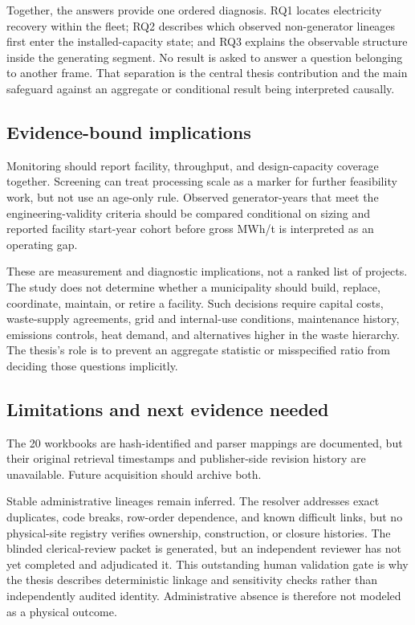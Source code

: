 \documentclass[12pt,a4paper]{article}
\begin{document}
Together, the answers provide one ordered diagnosis. RQ1 locates electricity
recovery within the fleet; RQ2 describes which observed non-generator lineages
first enter the installed-capacity state; and RQ3 explains the observable
structure inside the generating segment. No result is asked to answer a
question belonging to another frame. That separation is the central thesis
contribution and the main safeguard against an aggregate or conditional result
being interpreted causally.

\subsection{Evidence-bound implications}

Monitoring should report facility, throughput, and design-capacity coverage
together. Screening can treat processing scale as a marker for further
feasibility work, but not use an age-only rule. Observed generator-years that
meet the engineering-validity criteria should be compared conditional on sizing
and reported facility start-year cohort before gross MWh/t is interpreted as an
operating gap.

These are measurement and diagnostic implications, not a ranked list of
projects. The study does not determine whether a municipality should build,
replace, coordinate, maintain, or retire a facility. Such decisions require
capital costs, waste-supply agreements, grid and internal-use conditions,
maintenance history, emissions controls, heat demand, and alternatives higher
in the waste hierarchy. The thesis's role is to prevent an aggregate statistic
or misspecified ratio from deciding those questions implicitly.

\subsection{Limitations and next evidence needed}

The 20 workbooks are hash-identified and parser mappings are documented, but
their original retrieval timestamps and publisher-side revision history are
unavailable. Future acquisition should archive both.

Stable administrative lineages remain inferred. The resolver addresses exact
duplicates, code breaks, row-order dependence, and known difficult links, but no
physical-site registry verifies ownership, construction, or closure histories.
The blinded clerical-review packet is generated, but an independent reviewer has
not yet completed and adjudicated it. This outstanding human validation gate is
why the thesis describes deterministic linkage and sensitivity checks rather
than independently audited identity. Administrative absence is therefore not
modeled as a physical outcome.
\end{document}
